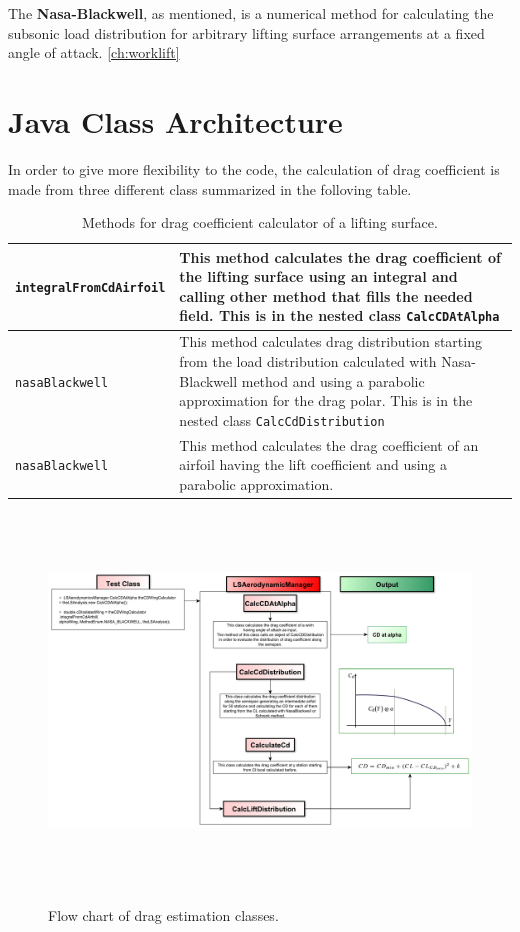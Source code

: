 The {\bfseries Nasa-Blackwell}, as mentioned, is a numerical method for calculating the subsonic load distribution for arbitrary lifting surface arrangements at a fixed angle of attack. \ref{ch:worklift}


\section{Java Class Architecture}


In order to give more flexibility to the code, the calculation of drag coefficient is made from three different class summarized in the folloving table.

\begin{table}[H]
\begin{tabular}{p{7cm}p{7.5cm}}
\toprule
\lstinline[language=Java]!integralFromCdAirfoil! & This method calculates the drag coefficient of the lifting surface using an integral and calling other method that fills the needed field. This is in the nested class \texttt{CalcCDAtAlpha}\\ \hline 
\lstinline[language=Java]!nasaBlackwell! &This method calculates drag distribution starting from the load distribution calculated with Nasa-Blackwell method and using a parabolic approximation for the drag polar.  This is in the nested class \texttt{CalcCdDistribution} \\ \hline 
\lstinline[language=Java]!nasaBlackwell! & This method calculates the drag coefficient of an airfoil having the lift coefficient and using a parabolic approximation.\\ 
\bottomrule
\end{tabular}
\caption{Methods for drag coefficient calculator of a lifting surface.}
\label{table:Table2}
\end{table}

\begin{figure}[H]
\centering
{\includegraphics[height=9.9cm]{immagini/dragflowchart.pdf}}
\caption{Flow chart of drag estimation classes.}
\label{fig:Drag}
\end{figure}

